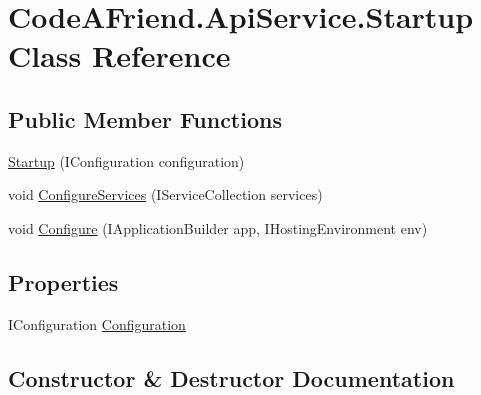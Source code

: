 \hypertarget{class_code_a_friend_1_1_api_service_1_1_startup}{}\section{Code\+A\+Friend.\+Api\+Service.\+Startup Class Reference}
\label{class_code_a_friend_1_1_api_service_1_1_startup}
\subsection*{Public Member Functions}
\begin{DoxyCompactItemize}
\item 
\mbox{\hyperlink{class_code_a_friend_1_1_api_service_1_1_startup_a3ab90cc0d2191a67d0a4a338904b2c60}{Startup}} (I\+Configuration configuration)
\item 
void \mbox{\hyperlink{class_code_a_friend_1_1_api_service_1_1_startup_ad26fcb90bcdee4851b54c95afed4bfc1}{Configure\+Services}} (I\+Service\+Collection services)
\item 
void \mbox{\hyperlink{class_code_a_friend_1_1_api_service_1_1_startup_a46281474c3b037d665db839d6bd65d04}{Configure}} (I\+Application\+Builder app, I\+Hosting\+Environment env)
\end{DoxyCompactItemize}
\subsection*{Properties}
\begin{DoxyCompactItemize}
\item 
I\+Configuration \mbox{\hyperlink{class_code_a_friend_1_1_api_service_1_1_startup_a53ca4b71e663aaae2bd2dc2e2b8395fb}{Configuration}}
\end{DoxyCompactItemize}


\subsection{Constructor \& Destructor Documentation}
\mbox{\label{class_code_a_friend_1_1_api_service_1_1_startup_a3ab90cc0d2191a67d0a4a338904b2c60}} 

